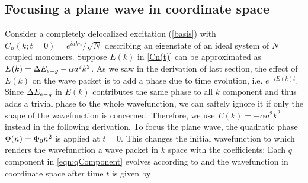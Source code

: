 \subsection{Focusing a plane wave in coordinate space}
\label{sec:planewaveFocusing}

Consider a completely delocalized excitation (\ref{basis})
with $C_n(k;t=0) = {e^{iakn}}/{\sqrt{N}}$ describing an eigenstate
of an ideal system of $N$ coupled monomers.
Suppose $E(k)$ in \autoref{Cn(t)}  can be approximated as $E(k) = \Delta E_{e-g}
-\alpha a^2 k^2$. As we saw in the derivation of last section, the effect of $E(k)$ on the wave packet is to
add a phase due to time evolution, i.e. $e^{-i E(k) t}$. Since $\Delta E_{e-g}$ in $E(k)$ contributes the same phase to all
$k$ component and thus adds a trivial phase to the whole wavefunction, we can saftely ignore it if only the shape of
the wavefunction is concerned. Therefore, we use   $E(k) = -\alpha a^2 k^2$ instead in the following derivation. To
focus the plane wave, the quadratic phase $\Phi(n) = \Phi_0
n^2$ is applied at $t=0$. This changes the initial wavefunction to 
which renders the wavefunction a wave packet in $k$ space with the coefficients:
Each $q$ component in \autoref{eqn:qComponent} evolves according to 
and the wavefunction in coordinate space after time $t$ is given by
%
